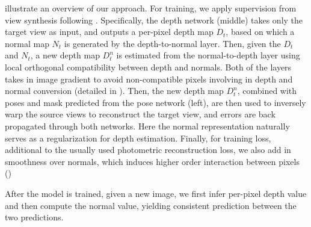  illustrate an overview of our approach. For training, we apply supervision from view synthesis following \cite{zhou2017unsupervised}. Specifically, the depth network (middle) takes only the target view as input, and
outputs a per-pixel depth map $D_t$, based on which a normal map $N_t$ is generated by the depth-to-normal layer. Then, given the $D_t$ and $N_t$, a new depth map $D_t^n$ is estimated from the normal-to-depth layer using local orthogonal compatibility between depth and normals. Both of the layers takes in image gradient to avoid non-compatible pixels involving in depth and normal conversion (detailed in ).
Then, the new depth map $D_t^n$, combined with poses and mask predicted from the pose network (left), are then used to inversely warp the source views to reconstruct the target view, and errors are back propagated through both networks. Here the normal representation naturally serves as a regularization for depth estimation. Finally, for training loss, additional to the usually used photometric reconstruction loss, we also add in smoothness over normals, which induces higher order interaction between pixels ()

After the model is trained, given a new image,  we first infer per-pixel depth value and then compute the normal value, yielding consistent prediction between the two predictions.




